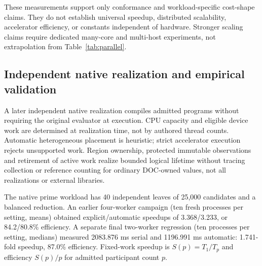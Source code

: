 These measurements support only conformance and workload-specific cost-shape claims. They do not establish universal speedup, distributed scalability, accelerator efficiency, or constants independent of hardware. Stronger scaling claims require dedicated many-core and multi-host experiments, not extrapolation from Table~\ref{tab:parallel}.

\subsection{Independent native realization and empirical validation}\label{sec:native-evidence}
A later independent native realization compiles admitted programs without requiring the original evaluator at execution. CPU capacity and eligible device work are determined at realization time, not by authored thread counts. Automatic heterogeneous placement is heuristic; strict accelerator execution rejects unsupported work. Region ownership, protected immutable observations and retirement of active work realize bounded logical lifetime without tracing collection or reference counting for ordinary DOC-owned values, not all realizations or external libraries.

The native prime workload has 40 independent leaves of 25,000 candidates and a balanced reduction. An earlier four-worker campaign (ten fresh processes per setting, means) obtained explicit/automatic speedups of 3.368/3.233, or 84.2/80.8\% efficiency. A separate final two-worker regression (ten processes per setting, medians) measured 2083.876 ms serial and 1196.991 ms automatic: 1.741-fold speedup, 87.0\% efficiency. Fixed-work speedup is $S(p)=T_1/T_p$ and efficiency $S(p)/p$ for admitted participant count $p$.

